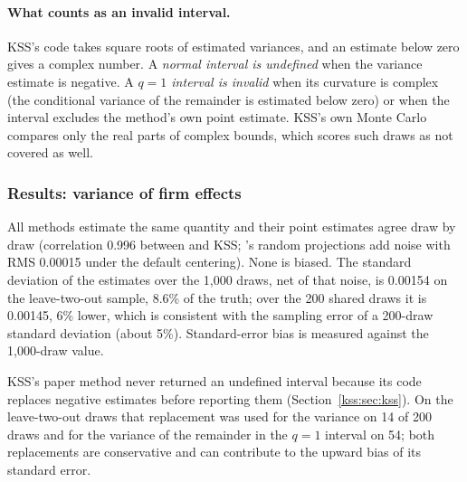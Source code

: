 \paragraph{What counts as an invalid interval.} KSS's code takes square roots of estimated variances, and an
estimate below zero gives a complex number. A \emph{normal interval is undefined} when the variance estimate is
negative. A \emph{$q=1$ interval is invalid} when its curvature is complex (the conditional variance of the
remainder is estimated below zero) or when the interval excludes the method's own point estimate. KSS's own
Monte Carlo compares only the real parts of complex bounds, which scores such draws as not covered as well.

\subsubsection{Results: variance of firm effects}\label{kss:sec:synth-firm}

All methods estimate the same quantity and their point estimates agree draw by draw (correlation 0.996 between
\fevc{} and KSS; \fevc's random projections add noise with RMS 0.00015 under the default centering). None is
biased. The standard deviation of the estimates over the 1{,}000 draws, net of that noise, is 0.00154 on the
leave-two-out sample, 8.6\% of the truth; over the 200 shared draws it is 0.00145, 6\% lower, which is consistent
with the sampling error of a 200-draw standard deviation (about 5\%). Standard-error bias is measured against
the 1{,}000-draw value.

KSS's paper method never returned an undefined interval because its code replaces negative estimates before
reporting them (Section~\ref{kss:sec:kss}). On the leave-two-out draws that replacement was used for the variance on
14 of 200 draws and for the variance of the remainder in the $q=1$ interval on 54; both replacements are
conservative and can contribute to the upward bias of its standard error.

